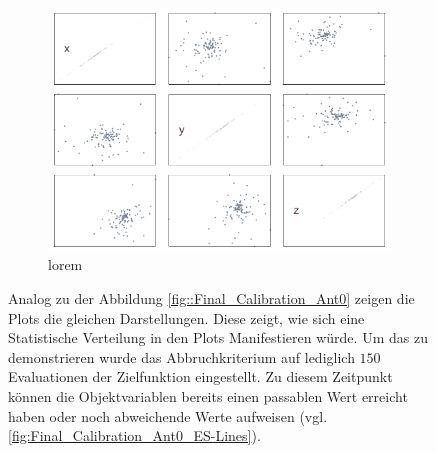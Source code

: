 \begin{figure}[H]
\begin{subfigure}[h]{0.4\textwidth}
                 \label{fig:abortedFinal_Calibration_Ant0_ES-Lines}
         \end{subfigure}
%
\\
%
         \begin{subfigure}[h]{0.4\textwidth}
                 \centering
                 \includegraphics[width=\textwidth]{img/calibration/aborted_calibration_ant0-scatter.png}
                 \caption{lorem}
                 \label{fig:abortedFinal_Calibration_Ant0_ES-Scatter}
         \end{subfigure}
%
         \caption[Statistisch verteilte Ergebnisse der Evolutionären Kalibrierung]{Analog zu der Abbildung \ref{fig::Final_Calibration_Ant0} zeigen die Plots die gleichen Darstellungen. Diese zeigt, wie sich eine Statistische Verteilung in den Plots Manifestieren würde. Um das zu demonstrieren wurde das Abbruchkriterium auf lediglich $150$ Evaluationen der Zielfunktion eingestellt. Zu diesem Zeitpunkt können die Objektvariablen bereits einen passablen Wert erreicht haben oder noch abweichende Werte aufweisen (vgl. \ref{fig:Final_Calibration_Ant0_ES-Lines}).}
         \label{fig::abortedFinal_Calibration_Ant0_ES}
\end{figure}
%

